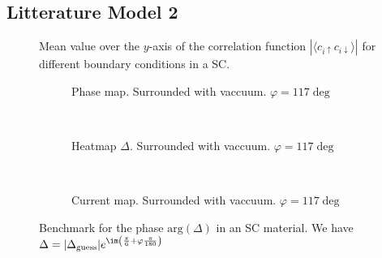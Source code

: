 \documentclass[../main.tex]{subfiles}
\begin{document}
\subsection{Litterature Model 2}
\begin{figure}[H]
    \centering
    
    \caption{Mean value over the $y$-axis of the correlation function $|\langle c_{i\uparrow} c_{i\downarrow}\rangle|$ for different boundary conditions in a SC.}
\end{figure}
\begin{figure}[H]
    \begin{subfigure}{0.4\textwidth}
        \centering
        \hspace{-4cm} %
        
        \caption{Phase map. Surrounded with vaccuum. $\varphi = 117\deg$}
        \label{fig:first}
    \end{subfigure}    \\
    \begin{subfigure}{0.4\textwidth}
        \centering
        \hspace{-4cm} %
        
        \caption{Heatmap $\Delta$. Surrounded with vaccuum. $\varphi = 117\deg$}
        \label{fig:first}
    \end{subfigure}    \\
    \hspace{0.1\textwidth}
    \begin{subfigure}{0.4\textwidth}
        \centering
        
        \caption{Current map. Surrounded with vaccuum. $\varphi = 117 \deg$}
        \label{fig:first}
    \end{subfigure}

    \caption{Benchmark for the phase $\text{arg}(\Delta)$ in an SC material. We have $\Delta = |\Delta_{\text{guess}}|e^{\im \left(\frac{\pi}{6} + \varphi\frac{\pi}{180}\right)}$}
\end{figure}    
\end{document}
